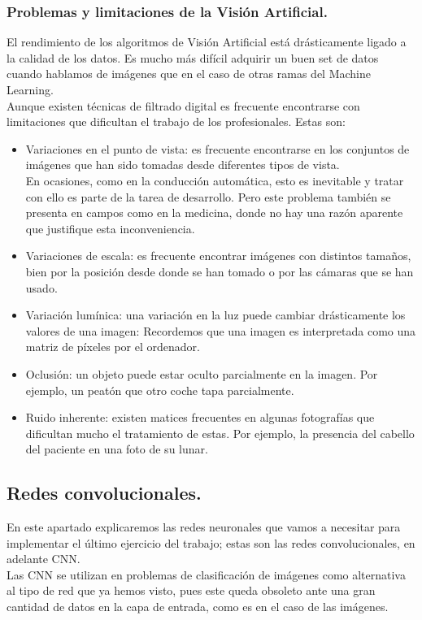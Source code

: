 \documentclass[a4paper,11pt]{article}
\begin{document}
\subsubsection{Problemas y limitaciones de la Visión Artificial.}
El rendimiento de los algoritmos de Visión Artificial está drásticamente ligado a la calidad de los datos. Es mucho más difícil adquirir un buen set de datos cuando hablamos de imágenes que en el caso de otras ramas del Machine Learning.
\\Aunque existen técnicas de filtrado digital es frecuente encontrarse con limitaciones que dificultan el trabajo de los profesionales. Estas son:
\begin{itemize}
\item Variaciones en el punto de vista: es frecuente encontrarse en los conjuntos de imágenes que han sido tomadas desde diferentes tipos de vista. \\

\noindent
En ocasiones, como en la conducción automática, esto es inevitable y tratar con ello es parte de la tarea de desarrollo. Pero este problema también se presenta en campos como en la medicina, donde no hay una razón aparente que justifique esta inconveniencia. 
\item Variaciones de escala: es frecuente encontrar imágenes con distintos tamaños, bien por la posición desde donde se han tomado o por las cámaras que se han usado.
\item Variación lumínica: una variación en la luz puede cambiar drásticamente los valores de una imagen: Recordemos que una imagen es interpretada como una matriz de píxeles por el ordenador.
\item Oclusión:  un objeto puede estar oculto parcialmente en la imagen. Por ejemplo, un peatón que otro coche tapa parcialmente.
\item Ruido inherente: existen matices frecuentes en algunas fotografías que dificultan mucho el tratamiento de estas. Por ejemplo, la presencia del cabello del paciente en una foto de su lunar.

\end{itemize}



\newpage
\subsection{Redes convolucionales.}
En este apartado explicaremos las redes neuronales que vamos a necesitar para implementar el último ejercicio del trabajo; estas son las redes convolucionales, en adelante CNN. \\Las CNN se utilizan en problemas de clasificación de imágenes como alternativa al tipo de red que ya hemos visto, pues este queda obsoleto ante una gran cantidad de datos en la capa de entrada, como es en el caso de las imágenes.\\ 
\end{document}

